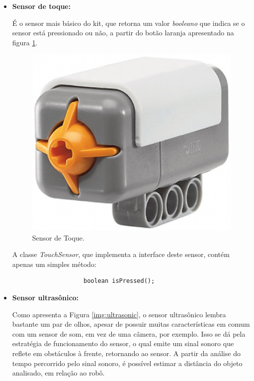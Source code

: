 		\begin{itemize}
			\item \textbf{Sensor de toque:}

				É o sensor mais básico do kit, que retorna um valor \textit{booleano} que indica se o sensor está pressionado ou não, a partir do botão laranja apresentado na figura \ref{img:sensorToque}.

				\begin{figure}[H]
					\centering
					\includegraphics[scale=0.2]{figuras/sensorToque.eps}
					\caption{Sensor de Toque.}
					\label{img:sensorToque}
				\end{figure}

				A classe \textit{TouchSensor}, que implementa a interface deste sensor, contém apenas um simples método:

				\begin{lstlisting}
					boolean isPressed();
				\end{lstlisting}

			\item \textbf{Sensor ultrasônico:}

				Como apresenta a Figura \ref{img:ultrasonic}, o sensor ultrasônico lembra bastante um par de olhos, apesar de possuir muitas características em comum com um sensor de som, em vez de uma câmera, por exemplo. Isso se dá pela estratégia de funcionamento do sensor, o qual emite um sinal sonoro que reflete em obstáculos à frente, retornando ao sensor. A partir da análise do tempo percorrido pelo sinal sonoro, é possível estimar a distância do objeto analisado, em relação ao robô.


\end{itemize}
